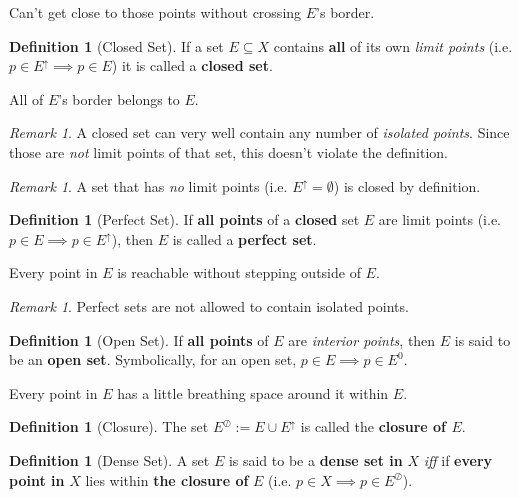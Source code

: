 \documentclass[a4paper,12pt]{report}
\newcommand{\tb}{\textbf}
\theoremstyle{plain}
\theoremstyle{definition}
\newtheorem{definition}[theorem]{\color{red}Definition} %
\theoremstyle{remark}
\newtheorem{remark}[theorem]{\color{ForestGreen}Remark} %
\begin{document}
\begin{insight}[Isolated]
Can't get close to those points without crossing $E$'s border.
\end{insight}
\begin{definition}[Closed Set]
If a set $E\subseteq X$ contains \tb{all} of its own \emph{limit points} (i.e. $p\in E^{\uparrow}\implies p\in E$) it is called a \tb{closed set}.
\end{definition}
\begin{insight}[Closed]
All of $E$'s border belongs to $E$.
\end{insight}
\begin{remark}
A closed set can very well contain any number of \emph{isolated points}. Since those are \emph{not} limit points of that set, this doesn't violate the definition.
\end{remark}
\begin{remark}
A set that has \emph{no} limit points (i.e. $E^{\uparrow}=\emptyset$) is closed by definition.
\end{remark}
\begin{definition}[Perfect Set]
If \tb{all points} of a \tb{closed} set $E$ are limit points (i.e. $p\in E\implies p\in E^{\uparrow}$), then $E$ is called a \tb{perfect set}.
\end{definition}
\begin{insight}[Perfect]
Every point in $E$ is reachable without stepping outside of $E$.
\end{insight}
\begin{remark}
Perfect sets are not allowed to contain isolated points.
\end{remark}
\begin{definition}[Open Set]
If \tb{all points} of $E$ are \emph{interior points}, then $E$ is said to be an \tb{open set}. Symbolically, for an open set, $p\in E\implies p\in E^0$.
\end{definition}
\begin{insight}[Open]
Every point in $E$ has a little breathing space around it within $E$.
\end{insight}
\begin{definition}[Closure]
The set $E^{\oslash}:=E\cup E^{\uparrow}$ is called the \tb{closure of $E$}.
\end{definition}
\begin{definition}[Dense Set]
A set $E$ is said to be a \tb{dense set in} $X$ \emph{iff} if \tb{every point in} $X$ lies within \tb{the closure of} $E$ (i.e. $p\in X\implies p\in E^{\oslash}$).
\end{definition}
\end{document}

